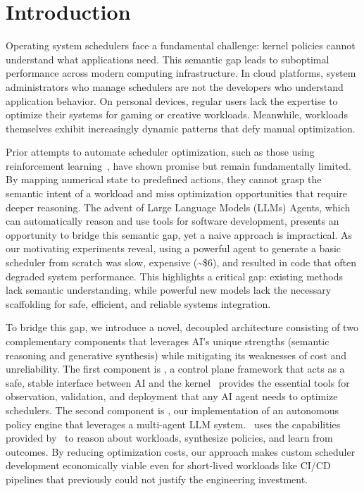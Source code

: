\section{Introduction}
\label{sec:intro}

Operating system schedulers face a fundamental challenge: kernel policies cannot understand what applications need. This semantic gap leads to suboptimal performance across modern computing infrastructure. In cloud platforms, system administrators who manage schedulers are not the developers who understand application behavior. On personal devices, regular users lack the expertise to optimize their systems for gaming or creative workloads. Meanwhile, workloads themselves exhibit increasingly dynamic patterns that defy manual optimization.

Prior attempts to automate scheduler optimization, such as those using reinforcement learning~\cite{mao2019decima, qiu2020firm}, have shown promise but remain fundamentally limited. By mapping numerical state to predefined actions, they cannot grasp the semantic intent of a workload and miss optimization opportunities that require deeper reasoning. The advent of Large Language Models (LLMs) Agents, which can automatically reason and use tools for software development, presents an opportunity to bridge this semantic gap, yet a naive approach is impractical. As our motivating experiments reveal, using a powerful agent to generate a basic scheduler from scratch was slow, expensive (\textasciitilde\$6), and resulted in code that often degraded system performance. This highlights a critical gap: existing methods lack semantic understanding, while powerful new models lack the necessary scaffolding for safe, efficient, and reliable systems integration.

To bridge this gap, we introduce a novel, decoupled architecture consisting of two complementary components that leverages AI's unique strengths (semantic reasoning and generative synthesis) while mitigating its weaknesses of cost and unreliability. The first component is \sys, a control plane framework that acts as a safe, stable interface between AI and the kernel \sys\ provides the essential tools for observation, validation, and deployment that any AI agent needs to optimize schedulers. The second component is \agent, our implementation of an autonomous policy engine that leverages a multi-agent LLM system. \agent\ uses the capabilities provided by \sys\ to reason about workloads, synthesize policies, and learn from outcomes. By reducing optimization costs, our approach makes custom scheduler development economically viable even for short-lived workloads like CI/CD pipelines that previously could not justify the engineering investment.


